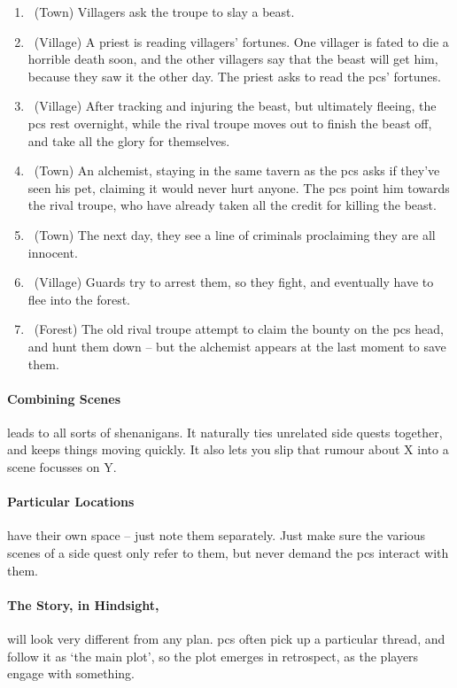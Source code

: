\begin{multicols}{2}
\begin{enumerate}
  \item
  \sqr~(Town)
  Villagers ask the troupe to slay a beast.
  \item
  \sqr~(Village)
  A priest is reading villagers' fortunes.
  One villager is fated to die a horrible death soon, and the other villagers say that the beast will get him, because they saw it the other day.
  The priest asks to read the \glspl{pc}' fortunes.
  \item
  \sqr~(Village)
  After tracking and injuring the beast, but ultimately fleeing, the \glspl{pc} rest overnight, while the rival troupe moves out to finish the beast off, and take all the glory for themselves.
  \item
  \sqr~(Town)
  An alchemist, staying in the same tavern as the \glspl{pc} asks if they've seen his pet, claiming it would never hurt anyone.
  The \glspl{pc} point him towards the rival troupe, who have already taken all the credit for killing the beast.
  \item
  \sqr~(Town)
  The next day, they see a line of criminals proclaiming they are all innocent.
  \item
  \sqr~(Village)
  Guards try to arrest them, so they fight, and eventually have to flee into the forest.
  \item
  \sqn~(Forest)
  The old rival troupe attempt to claim the bounty on the \glspl{pc} head, and hunt them down -- but the alchemist appears at the last moment to save them.

\end{enumerate}

\paragraph{Combining Scenes}
leads to all sorts of shenanigans.
It naturally ties unrelated side quests together, and keeps things moving quickly.
It also lets you slip that rumour about X into a scene focusses on Y.

\paragraph{Particular Locations}
have their own space -- just note them separately.
Just make sure the various scenes of a side quest only refer to them, but never demand the \glspl{pc} interact with them.

\paragraph{The Story, in Hindsight,}
will look very different from any plan.
\Glspl{pc} often pick up a particular thread, and follow it as `the main plot', so the plot emerges in retrospect, as the players engage with something.


\end{multicols}
